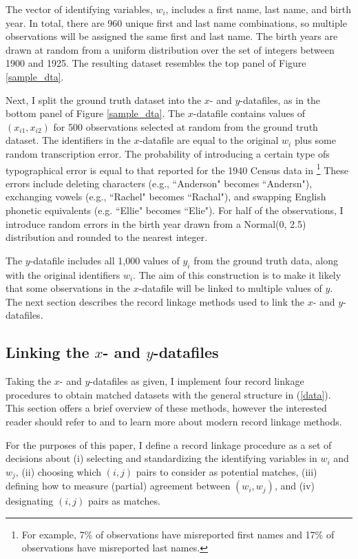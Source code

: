\documentclass[12pt]{article}
\begin{document}
The vector of identifying variables, $w_i$, includes a first name, last name, and birth year.  In total, there are 960 unique first and last name combinations, so multiple observations will be assigned the same first and last name.  The birth years are drawn at random from a uniform distribution over the set of integers between 1900 and 1925.  The resulting dataset resembles the top panel of Figure \ref{sample_dta}.  
 
 
 
Next, I split the ground truth dataset into the $x$- and $y$-datafiles, as in the bottom panel of Figure \ref{sample_dta}.  The $x$-datafile contains values of $(x_{i1},x_{i2})$ for 500 observations selected at random from the ground truth dataset.  The identifiers in the $x$-datafile are equal to the original $w_i$ plus some random transcription error.  The probability of introducing a certain type ofs typographical error is equal to that reported for the 1940 Census data in \cite{abe2019}\footnote{For example, 7\% of observations have misreported first names and 17\% of observations have misreported last names.} These errors include deleting characters (e.g., ``Anderson"  becomes ``Andersn"), exchanging vowels (e.g., ``Rachel" becomes ``Rachal"), and swapping English phonetic equivalents (e.g. ``Ellie" becomes ``Elie").  For half of the observations, I introduce random errors in the birth year drawn from a Normal(0, 2.5) distribution and rounded to the nearest integer.  

The $y$-datafile includes all 1,000 values of $y_i$ from the ground truth data, along with the original identifiers $w_i$.  The aim of this construction is to make it likely that some observations in the $x$-datafile will be linked to multiple values of $y$.  The next section describes the record linkage methods used to link the $x$- and $y$-datafiles. 

\subsection{Linking the $x$- and $y$-datafiles}
Taking the $x$- and $y$-datafiles as given, I implement four record linkage procedures to obtain matched datasets with the general structure in (\ref{data}).  This section offers a brief overview of these methods, however the interested reader should refer to \citet*{harron_book, christen2012} and \citet*{herzog07} to learn more about modern record linkage methods. 

For the purposes of this paper, I define a record linkage procedure as a set of decisions about (i) selecting and standardizing the identifying variables in $w_i$ and $w_j$, (ii) choosing which $(i,j)$ pairs to consider as potential matches, (iii) defining how to measure (partial) agreement between $(w_i,w_j)$, and (iv) designating $(i,j)$ pairs as matches.  
\end{document}
